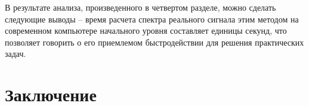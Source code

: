 В результате анализа, произведенного в четвертом разделе, можно сделать следующие выводы -- время расчета спектра реального сигнала этим методом на современном компьютере начального уровня составляет единицы секунд, что позволяет говорить о его приемлемом быстродействии для решения практических задач.	

\section*{Заключение}



